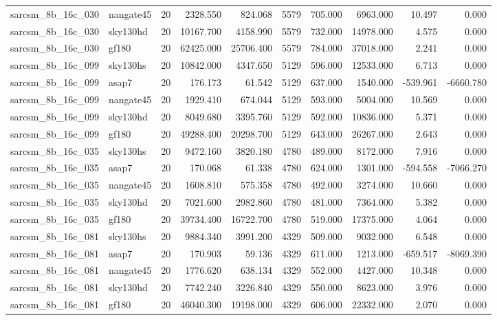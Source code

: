\begin{tabular}{llrrrrrrrr}
sarcsm\_8b\_16c\_030 & nangate45 & 20 & 2328.550 & 824.068 & 5579 & 705.000 & 6963.000 & 10.497 & 0.000 \\
sarcsm\_8b\_16c\_030 & sky130hd & 20 & 10167.700 & 4158.990 & 5579 & 732.000 & 14978.000 & 4.575 & 0.000 \\
sarcsm\_8b\_16c\_030 & gf180 & 20 & 62425.000 & 25706.400 & 5579 & 784.000 & 37018.000 & 2.241 & 0.000 \\
sarcsm\_8b\_16c\_099 & sky130hs & 20 & 10842.000 & 4347.650 & 5129 & 596.000 & 12533.000 & 6.713 & 0.000 \\
sarcsm\_8b\_16c\_099 & asap7 & 20 & 176.173 & 61.542 & 5129 & 637.000 & 1540.000 & -539.961 & -6660.780 \\
sarcsm\_8b\_16c\_099 & nangate45 & 20 & 1929.410 & 674.044 & 5129 & 593.000 & 5004.000 & 10.569 & 0.000 \\
sarcsm\_8b\_16c\_099 & sky130hd & 20 & 8049.680 & 3395.760 & 5129 & 592.000 & 10836.000 & 5.371 & 0.000 \\
sarcsm\_8b\_16c\_099 & gf180 & 20 & 49288.400 & 20298.700 & 5129 & 643.000 & 26267.000 & 2.643 & 0.000 \\
sarcsm\_8b\_16c\_035 & sky130hs & 20 & 9472.160 & 3820.180 & 4780 & 489.000 & 8172.000 & 7.916 & 0.000 \\
sarcsm\_8b\_16c\_035 & asap7 & 20 & 170.068 & 61.338 & 4780 & 624.000 & 1301.000 & -594.558 & -7066.270 \\
sarcsm\_8b\_16c\_035 & nangate45 & 20 & 1608.810 & 575.358 & 4780 & 492.000 & 3274.000 & 10.660 & 0.000 \\
sarcsm\_8b\_16c\_035 & sky130hd & 20 & 7021.600 & 2982.860 & 4780 & 481.000 & 7364.000 & 5.382 & 0.000 \\
sarcsm\_8b\_16c\_035 & gf180 & 20 & 39734.400 & 16722.700 & 4780 & 519.000 & 17375.000 & 4.064 & 0.000 \\
sarcsm\_8b\_16c\_081 & sky130hs & 20 & 9884.340 & 3991.200 & 4329 & 509.000 & 9032.000 & 6.548 & 0.000 \\
sarcsm\_8b\_16c\_081 & asap7 & 20 & 170.903 & 59.136 & 4329 & 611.000 & 1213.000 & -659.517 & -8069.390 \\
sarcsm\_8b\_16c\_081 & nangate45 & 20 & 1776.620 & 638.134 & 4329 & 552.000 & 4427.000 & 10.348 & 0.000 \\
sarcsm\_8b\_16c\_081 & sky130hd & 20 & 7742.240 & 3226.840 & 4329 & 550.000 & 8623.000 & 3.976 & 0.000 \\
sarcsm\_8b\_16c\_081 & gf180 & 20 & 46040.300 & 19198.000 & 4329 & 606.000 & 22332.000 & 2.070 & 0.000 \\

\end{tabular}
